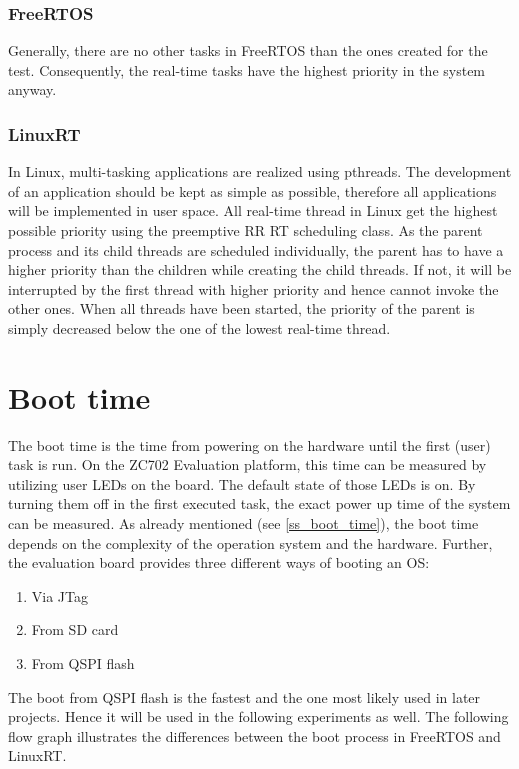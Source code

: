 \subsubsection{FreeRTOS}
Generally, there are no other tasks in FreeRTOS than the ones created for the test.
Consequently, the real-time tasks have the highest priority in the system anyway.

\subsubsection{LinuxRT}
In Linux, multi-tasking applications are realized using pthreads.
The development of an application should be kept as simple as possible, therefore all applications will be implemented in user space.
All real-time thread in Linux get the highest possible priority using the preemptive \ac{RR} \ac{RT} scheduling class.
As the parent process and its child threads are scheduled individually, the parent has to have a higher priority than the children while creating the child threads.
If not, it will be interrupted by the first thread with higher priority and hence cannot invoke the other ones.
When all threads have been started, the priority of the parent is simply decreased below the one of the lowest real-time thread.
 
\section{Boot time}\label{s_boot_time}
The boot time is the time from powering on the hardware until the first (user) task is run. 
On the ZC702 Evaluation platform, this time can be measured by utilizing user \acp{LED} on the board.  
The default state of those \acp{LED} is on.
By turning them off in the first executed task, the exact power up time of the system can be measured.  
As already mentioned (see \ref{ss_boot_time}), the boot time depends on the complexity of the operation system and the hardware. 
Further, the evaluation board provides three different ways of booting an \ac{OS}:
\begin{enumerate}
	\item Via \ac{JTag}
	\item From \ac{SD} card
	\item From \ac{QSPI} flash
\end{enumerate}
The boot from \ac{QSPI} flash is the fastest and the one most likely used in later projects.
Hence it will be used in the following experiments as well.
The following flow graph illustrates the differences between the boot process in FreeRTOS and LinuxRT.


